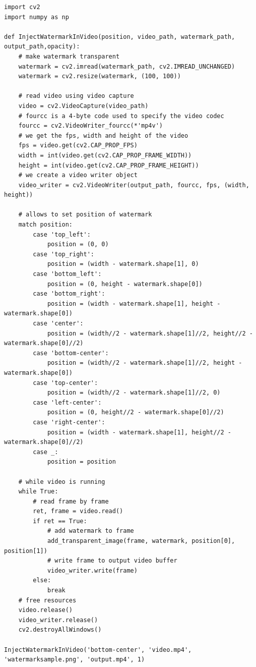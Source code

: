 \documentclass[ebook,12pt,oneside,openany]{memoir}
\begin{document}
\begin{lstlisting}[frame=single,breaklines,globe=5]
import cv2
import numpy as np

def InjectWatermarkInVideo(position, video_path, watermark_path, output_path,opacity):
    # make watermark transparent
    watermark = cv2.imread(watermark_path, cv2.IMREAD_UNCHANGED)
    watermark = cv2.resize(watermark, (100, 100))    
                     
    # read video using video capture
    video = cv2.VideoCapture(video_path)
    # fourcc is a 4-byte code used to specify the video codec
    fourcc = cv2.VideoWriter_fourcc(*'mp4v')
    # we get the fps, width and height of the video
    fps = video.get(cv2.CAP_PROP_FPS)
    width = int(video.get(cv2.CAP_PROP_FRAME_WIDTH))
    height = int(video.get(cv2.CAP_PROP_FRAME_HEIGHT))
    # we create a video writer object
    video_writer = cv2.VideoWriter(output_path, fourcc, fps, (width, height))

    # allows to set position of watermark
    match position:
        case 'top_left':
            position = (0, 0)
        case 'top_right':
            position = (width - watermark.shape[1], 0)
        case 'bottom_left':
            position = (0, height - watermark.shape[0])
        case 'bottom_right':
            position = (width - watermark.shape[1], height - watermark.shape[0])
        case 'center':
            position = (width//2 - watermark.shape[1]//2, height//2 - watermark.shape[0]//2)
        case 'bottom-center':
            position = (width//2 - watermark.shape[1]//2, height - watermark.shape[0])
        case 'top-center':
            position = (width//2 - watermark.shape[1]//2, 0)
        case 'left-center':
            position = (0, height//2 - watermark.shape[0]//2)
        case 'right-center':
            position = (width - watermark.shape[1], height//2 - watermark.shape[0]//2)
        case _:
            position = position

    # while video is running
    while True:
        # read frame by frame
        ret, frame = video.read()
        if ret == True:
            # add watermark to frame
            add_transparent_image(frame, watermark, position[0], position[1])
            # write frame to output video buffer
            video_writer.write(frame)                         
        else:
            break
    # free resources
    video.release()
    video_writer.release()
    cv2.destroyAllWindows()
    
InjectWatermarkInVideo('bottom-center', 'video.mp4', 'watermarksample.png', 'output.mp4', 1)  
\end{lstlisting}
\end{document}
